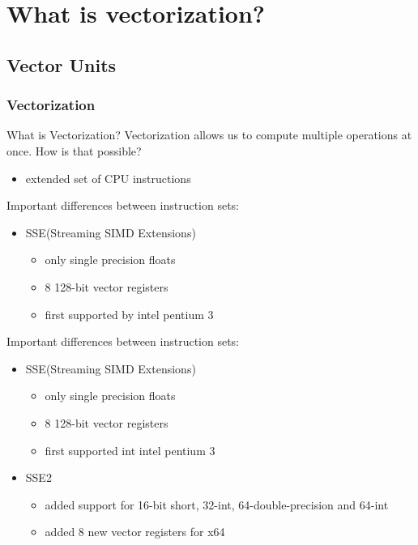 \documentclass[compress]{beamer}
\begin{document}
\section{What is vectorization?}
\subsection{Vector Units}

\begin{frame}[fragile]
    \frametitle{Vectorization}

What is Vectorization?\newline\newline
Vectorization allows us to compute multiple operations at once.\newline\newline
How is that possible?
    \begin{itemize}
        \item extended set of CPU instructions
    \end{itemize}
\end{frame}
\begin{frame}
    Important differences between instruction sets:
    \begin{itemize}
        \item SSE(Streaming SIMD Extensions)
            \begin{itemize}
                \item only single precision floats
                \item 8 128-bit vector registers
                \item first supported by intel pentium 3
            \end{itemize}
               \end{itemize}
   \end{frame}
   \begin{frame}
    Important differences between instruction sets:
    \begin{itemize}
        \item SSE(Streaming SIMD Extensions)
            \begin{itemize}
                \item only single precision floats
                \item 8 128-bit vector registers
                \item first supported int intel pentium 3
            \end{itemize}
        \item SSE2
            \begin{itemize}
                \item added support for 16-bit short, 32-int, 64-double-precision and 64-int
                \item added 8 new vector registers for x64
            \end{itemize}
               \end{itemize}
   \end{frame}
\end{document}
